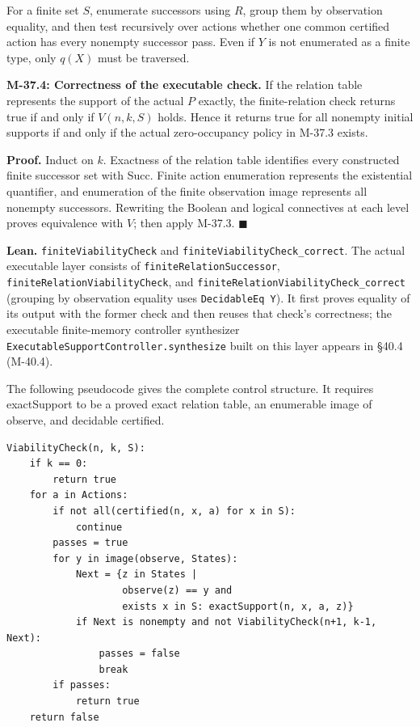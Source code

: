 \documentclass[
  english,
  11pt,
  oneside]{book}
\newcounter{none} %
\begin{document}
For a finite set \(S\), enumerate successors using \(R\), group them by observation equality, and then test recursively over actions whether one common certified action has every nonempty successor pass. Even if \(Y\) is not enumerated as a finite type, only \(q(X)\) must be traversed.

\hypertarget{m-37-4}{}\label{m-37-4}

\textbf{M-37.4: Correctness of the executable check.} If the relation table represents the support of the actual \(P\) exactly, the finite-relation check returns true if and only if \(V(n,k,S)\) holds. Hence it returns true for all nonempty initial supports if and only if the actual zero-occupancy policy in M-37.3 exists.

\textbf{Proof.} Induct on \(k\). Exactness of the relation table identifies every constructed finite successor set with Succ. Finite action enumeration represents the existential quantifier, and enumeration of the finite observation image represents all nonempty successors. Rewriting the Boolean and logical connectives at each level proves equivalence with \(V\); then apply M-37.3. \(\blacksquare\)

\textbf{Lean.} \nolinkurl{finiteViabilityCheck} and \nolinkurl{finiteViabilityCheck_correct}. The actual executable layer consists of \nolinkurl{finiteRelationSuccessor}, \nolinkurl{finiteRelationViabilityCheck}, and \nolinkurl{finiteRelationViabilityCheck_correct} (grouping by observation equality uses \nolinkurl{DecidableEq Y}). It first proves equality of its output with the former check and then reuses that check's correctness; the executable finite-memory controller synthesizer \nolinkurl{ExecutableSupportController.synthesize} built on this layer appears in §40.4 (M-40.4).

The following pseudocode gives the complete control structure. It requires exactSupport to be a proved exact relation table, an enumerable image of observe, and decidable certified.

\begin{verbatim}
ViabilityCheck(n, k, S):
    if k == 0:
        return true
    for a in Actions:
        if not all(certified(n, x, a) for x in S):
            continue
        passes = true
        for y in image(observe, States):
            Next = {z in States |
                    observe(z) == y and
                    exists x in S: exactSupport(n, x, a, z)}
            if Next is nonempty and not ViabilityCheck(n+1, k-1, Next):
                passes = false
                break
        if passes:
            return true
    return false
\end{verbatim}
\end{document}
